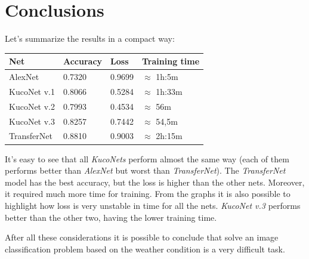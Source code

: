 \documentclass[11pt]{article}
\begin{document}
\section{Conclusions}
Let's summarize the results in a compact way: \\
\begin{table}[H]
	\begin{center}
		\begin{tabular}{|p{}|p{}|p{}|p{}|}
			\hline
			\textbf{Net} & \textbf{Accuracy} & \textbf{Loss} & \textbf{Training time} \\
			\hline
			AlexNet & 0.7320 & 0.9699 & $\approx$ 1h:5m \\
			\hline
			KucoNet v.1 & 0.8066 & 0.5284 & $\approx$ 1h:33m \\
			\hline
			KucoNet v.2 & 0.7993 & 0.4534 & $\approx$ 56m \\
			\hline
			KucoNet v.3 & 0.8257 & 0.7442 & $\approx$ 54,5m \\
			\hline
			TransferNet & 0.8810 & 0.9003 & $\approx$ 2h:15m \\
			\hline
		\end{tabular}
	\end{center}
\end{table}
It's easy to see that all \textit{KucoNets} perform almost the same way (each of them performs better than \textit{AlexNet} but worst than \textit{TransferNet}). The \textit{TransferNet} model has the best accuracy, but the loss is higher than the other nets. Moreover, it required much more time for training. From the graphs it is also possible to highlight how loss is very unstable in time for all the nets. \textit{KucoNet v.3} performs better than the other two, having the lower training time.

After all these considerations it is possible to conclude that solve an image classification problem based on the weather condition is a very difficult task.
\end{document}
